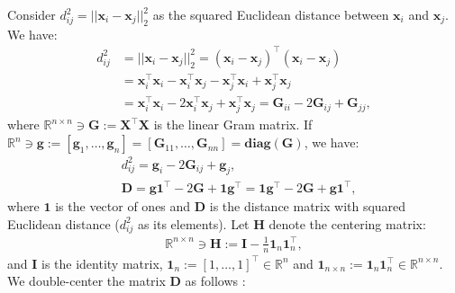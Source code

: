 \documentclass[lang=cn,10pt]{gorgeousnbook}
\numberwithin{equation}{section}%
\numberwithin{figure}{section}%
\begin{document}
Consider $d_{ij}^2 = ||\boldsymbol{x}_i - \boldsymbol{x}_j||_2^2$ as the squared Euclidean distance between $\boldsymbol{x}_i$ and $\boldsymbol{x}_j$. We have:
\begin{align*}
d_{ij}^2 &= ||\boldsymbol{x}_i - \boldsymbol{x}_j||_2^2 = (\boldsymbol{x}_i - \boldsymbol{x}_j)^\top (\boldsymbol{x}_i - \boldsymbol{x}_j) \\
&= \boldsymbol{x}_i^\top \boldsymbol{x}_i - \boldsymbol{x}_i^\top \boldsymbol{x}_j - \boldsymbol{x}_j^\top \boldsymbol{x}_i + \boldsymbol{x}_j^\top \boldsymbol{x}_j \\
&= \boldsymbol{x}_i^\top \boldsymbol{x}_i - 2\boldsymbol{x}_i^\top \boldsymbol{x}_j + \boldsymbol{x}_j^\top \boldsymbol{x}_j = \boldsymbol{G}_{ii} - 2 \boldsymbol{G}_{ij} + \boldsymbol{G}_{jj},
\end{align*}
where $\mathbb{R}^{n \times n} \ni \boldsymbol{G} := \boldsymbol{X}^\top \boldsymbol{X}$ is the linear Gram matrix. If $\mathbb{R}^n \ni \boldsymbol{g} := [\boldsymbol{g}_1, \dots, \boldsymbol{g}_n] = [\boldsymbol{G}_{11}, \dots, \boldsymbol{G}_{nn}] = \textbf{diag}(\boldsymbol{G})$, we have:
\begin{align*}
& d_{ij}^2 = \boldsymbol{g}_i -2\boldsymbol{G}_{ij} + \boldsymbol{g}_j, \\
& \boldsymbol{D} = \boldsymbol{g}\boldsymbol{1}^\top -2 \boldsymbol{G} +\boldsymbol{1}\boldsymbol{g}^\top = \boldsymbol{1}\boldsymbol{g}^\top -2 \boldsymbol{G} + \boldsymbol{g}\boldsymbol{1}^\top,
\end{align*}
where $\boldsymbol{1}$ is the vector of ones and $\boldsymbol{D}$ is the distance matrix with squared Euclidean distance ($d_{ij}^2$ as its elements). 
Let $\boldsymbol{H}$ denote the centering matrix:
\begin{align}\label{equation_centered_matrix}
\mathbb{R}^{n \times n} \ni \boldsymbol{H} := \boldsymbol{I} - \frac{1}{n} \boldsymbol{1}_n\boldsymbol{1}_n^\top,
\end{align}
and $\boldsymbol{I}$ is the identity matrix, $\boldsymbol{1}_n := [1, \dots, 1]^\top \in \mathbb{R}^n$ and $\boldsymbol{1}_{n \times n} := \boldsymbol{1}_n \boldsymbol{1}_n^\top \in \mathbb{R}^{n \times n}$. 
 We double-center the matrix $\boldsymbol{D}$ as follows \cite{oldford2018lecture}:
\end{document}
